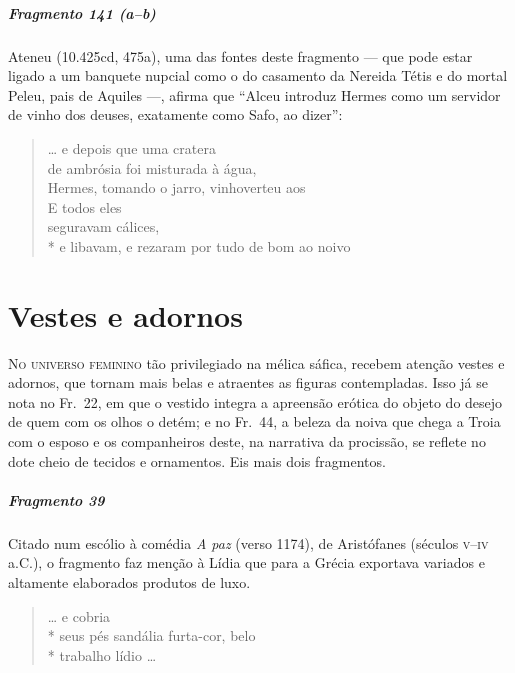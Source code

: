 \paragraph{Fragmento 141 (a--b)}

{\small Ateneu (10.425cd, 475a), uma das fontes deste fragmento --- que pode estar ligado a um banquete
nupcial como o do casamento da Nereida Tétis e do mortal Peleu, pais de Aquiles
---, afirma que ``Alceu introduz Hermes como um servidor de vinho dos
deuses, exatamente como Safo, ao dizer'':}

\begin{verse}
\ldots{} e depois que uma cratera\\
de ambrósia foi misturada à água,\\
Hermes, tomando o jarro, vinhoverteu aos \\
E todos eles\\
seguravam cálices,\\*
e libavam, e rezaram por tudo de bom ao \qb{}noivo
\end{verse}

\chapter{Vestes e adornos}

\textsc{No universo feminino} tão privilegiado na mélica sáfica, recebem atenção vestes e
adornos, que tornam mais belas e atraentes as figuras contempladas. Isso já se
nota no Fr.~22, em que o vestido integra a apreensão erótica do objeto do
desejo de quem com os olhos o detém; e no Fr.~44, a beleza da noiva que chega a
Troia com o esposo e os companheiros deste, na narrativa da procissão, se
reflete no dote cheio de tecidos e ornamentos. Eis mais dois fragmentos.


\paragraph{Fragmento 39}

{\small Citado num escólio à comédia \textit{A paz} (verso 1174), de Aristófanes (séculos \textsc{v}--\textsc{iv} a.C.),
o fragmento faz menção à Lídia que para a Grécia exportava variados e altamente
elaborados produtos de luxo.}

\begin{verse}
\ldots{} e cobria\\*
seus pés sandália furta-cor, belo\\*
trabalho lídio \ldots{}
\end{verse}

